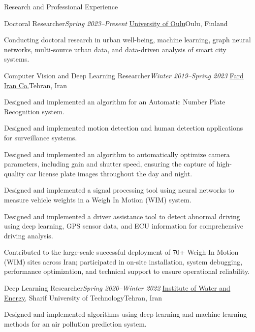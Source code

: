 \documentclass{resume} %
\begin{document}
\begin{rSection}{Research and Professional Experience}
\vspace{+.1cm}

\begin{rSubsection}{Doctoral Researcher}{\em Spring 2023--Present}
{\href{https://www.oulu.fi/}{University of Oulu}}{Oulu, Finland}
    \item Conducting doctoral research in urban well-being, machine learning, graph neural networks, multi-source urban data, and data-driven analysis of smart city systems.
\end{rSubsection}

\begin{rSubsection}{Computer Vision and Deep Learning Researcher}{\em Winter 2019--Spring 2023}
{\href{https://en.towzin.com/}{Fard Iran Co.}}{Tehran, Iran}
    \item Designed and implemented an algorithm for an Automatic Number Plate Recognition system.
    \item Designed and implemented motion detection and human detection applications for surveillance systems.
    \item Designed and implemented an algorithm to automatically optimize camera parameters, including gain and shutter speed, ensuring the capture of high-quality car license plate images throughout the day and night.
    \item Designed and implemented a signal processing tool using neural networks to measure vehicle weights in a Weigh In Motion (WIM) system.
    \item Designed and implemented a driver assistance tool to detect abnormal driving using deep learning, GPS sensor data, and ECU information for comprehensive driving analysis.
    \item Contributed to the large-scale successful deployment of 70+ Weigh In Motion (WIM) sites across Iran; participated in on-site installation, system debugging, performance optimization, and technical support to ensure operational reliability.
\end{rSubsection}

\begin{rSubsection}{Deep Learning Researcher}{\em Spring 2020--Winter 2022}
{\href{http://iwe.sharif.edu/}{Institute of Water and Energy}, Sharif University of Technology}{Tehran, Iran}
    \item Designed and implemented algorithms using deep learning and machine learning methods for an air pollution prediction system.
\end{rSubsection}

\end{rSection}
\end{document}
